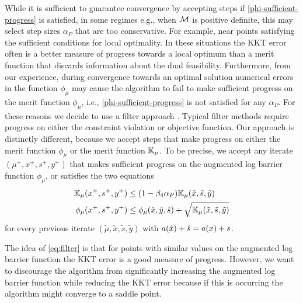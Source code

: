 \documentclass{article}
\begin{document}
While it is sufficient to guarantee convergence by accepting steps if \eqref{phi-sufficient-progress} is satisfied, in some regimes e.g., when $\mathcal{M}$ is positive definite, this may select step sizes $\alpha_{P}$ that are too conservative.  For example, near points satisfying the sufficient conditions for local optimality. In these situations the KKT error often is a better measure of progress towards a local optimum than a merit function that discards information about the dual feasibility. Furthermore, from our experience, during convergence towards an optimal solution numerical errors in the function $\phi_{\mu}$ may cause the algorithm to fail to make sufficient progress on the merit function $\phi_{\mu}$, i.e., \eqref{phi-sufficient-progress} is not satisfied for any $\alpha_{P}$. For these reasons we decide to use a filter approach \cite{fletcher2002nonlinear,wachter2006implementation}. Typical filter methods \cite{fletcher2002nonlinear} require progress on either the constraint violation or objective function. Our approach is distinctly different, because we accept steps that make progress on either the merit function $\phi_{\mu}$ or the merit function $\mathbb{K}_{\mu}$.
To be precise, we accept any iterate $(\mu^{+}, x^{+}, s^{+}, y^{+})$ that makes sufficient progress on the augmented log barrier function $\phi_{\mu}$, or satisfies the two equations
\begin{subequations}\label{eq:filter}
\begin{flalign}
\meritKKT_{\mu} (x^{+}, s^{+}, y^{+}) &\le (1 - \parKKTReductFactor \alpha_{P} ) \meritKKT_{\mu} (\tilde{x}, \tilde{s}, \tilde{y}) \label{eq:kkt-progress} \\
\phi_{\mu}(x^{+}, s^{+}, y^{+}) &\le \phi_{\mu}(\hat{x}, \hat{y}, \hat{s}) + \sqrt{\meritKKT_{\mu} (\tilde{x}, \tilde{s}, \tilde{y})} %
\end{flalign} %
\end{subequations}
 for every previous iterate $(\tilde{\mu}, \tilde{x}, \tilde{s}, \tilde{y})$ with $a(\hat{x}) + \hat{s} = a(x) + s$.

The idea of \eqref{eq:filter} is that for points with similar values on the augmented log barrier function the KKT error is a good measure of progress. However, we want to discourage the algorithm from significantly increasing the augmented log barrier function while reducing the KKT error because if this is occurring the algorithm might converge to a saddle point. 
\end{document}
